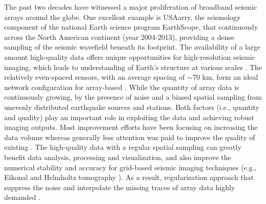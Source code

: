 The past two decades have witnessed a major proliferation of broadband seismic arrays around the globe.  One excellent example is USAarry, the seismology component of the national Earth science program EarthScope, that  continuously across the North American continent (year 2004-2013), providing a dense sampling of the seismic wavefield beneath its footprint. The availability of a large amount  high-quality data offers unique opportunities for high-resolution seismic imaging, which leads to   understanding of  Earth's structure at various scales \cite[]{van2005surface,moschetti2007surface,yang2008structure,lin2009eikonal,yuan2010lithospheric,sigloch2011mantle,porritt2014seismic,schaeffer2014imaging,schmandt2014p,bao2016imaging,burdick2017model}. The relatively even-spaced sensors, with an average spacing of $ \sim $70 km, form an ideal network configuration for   array-based  \cite[]{rost2002array,gu2010arrays}. While the quantity of array data is continuously growing,  by the presence of noise and a biased spatial sampling  from unevenly distributed earthquake sources and stations. Both factors (i.e., quantity and quality) play an important role in exploiting the data and achieving robust imaging outputs. Most  improvement efforts have been focusing on increasing the data volume whereas generally less attention was paid to improve the quality of existing . The high-quality data with a regular spatial sampling can greatly benefit data analysis, processing and visualization, and also improve the numerical stability and accuracy for grid-based seismic imaging techniques (e.g., Eikonal \cite[]{lin2009eikonal} and Helmholtz tomography \cite[]{lin2011helmholtz}). As a result, regularization approach that suppress the noise and interpolate the missing traces of array data  highly demanded \cite[]{mostafa2016geo,mostafa2016bssa,schneider2017improvement}. 

